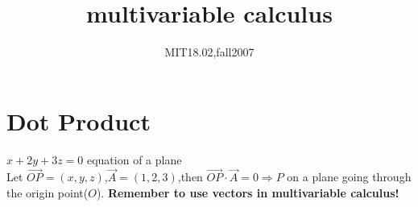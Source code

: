 \documentclass{article}
\title{multivariable calculus}
\author{MIT18.02,fall2007}
\date{}
\begin{document}
\maketitle
\section{Dot Product}
$x+2y+3z=0$ equation of a plane\\
Let $\overrightarrow{OP}=(x,y,z)$,$\overrightarrow{A}=(1,2,3)$,then $\overrightarrow{OP}\cdot\overrightarrow{A}=0\Rightarrow P$
on a plane going through the origin point($O$).
\textbf{Remember to use vectors in multivariable calculus!}
\end{document}
